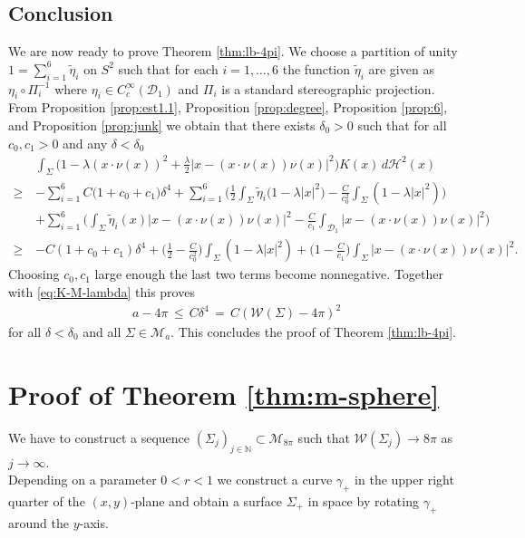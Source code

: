 \documentclass[reqno,makeidx,12pt]{amsart}
\theoremstyle{note}
\theoremstyle{definition}
\begin{document}
\subsection{Conclusion}
We are now ready to prove Theorem \ref{thm:lb-4pi}. We choose a partition of unity $1=\sum_{i=1}^6 \tilde{\eta}_i$ on $S^2$ such that for each $i=1,\dots,6$ the function $\tilde{\eta}_i$ are given as $\eta_i\circ {\Pi}_i^{-1}$ where $\eta_i \in C^\infty_c({\mathcal{D}}_1)$ and ${\Pi}_i$ is a standard stereographic projection. From Proposition \ref{prop:est1.1}, Proposition \ref{prop:degree}, Proposition \ref{prop:6}, and Proposition \ref{prop:junk} we obtain that there exists $\delta_0>0$ such that for all $c_0,c_1>0$ and any $\delta<\delta_0$  
\begin{align*}
	&\int_\Sigma \Big(1-\lambda(x\cdot\nu(x))^2 +
  	\frac{\lambda}{2}|x- (x\cdot\nu(x))\nu(x)|^2\Big) K(x)\,d{\ensuremath{\mathcal{H}}}^2(x) \\
	\geq\, &-\sum_{i=1}^6  C\big(1+c_0 + c_1 \big) \delta^4 + 
	\sum_{i=1}^6  \Big(\frac{1}{2} \int_{\Sigma} \tilde{\eta}_i \big(1-\lambda|x|^2\big) - \frac{C}{c_0^2} \int_{\Sigma} (1-\lambda|x|^2)\Big)\\
	&  +\sum_{i=1}^6  \Big(\int_{\Sigma} \tilde{\eta}_i(x) |x-(x	\cdot\nu(x))\nu(x)|^2  - \frac{C}{c_1}  \int_{{\mathcal{D}}_1 } |x-(x\cdot\nu(x))\nu(x)|^2\Big)\\
  	\geq\,& -C(1+c_0+c_1)\delta^4 +\Big(\frac{1}{2}- \frac{C}{c_0^2}\Big) \int_{\Sigma} (1-\lambda|x|^2) +  \Big(1-\frac{C}{c_1}\Big)\int_{\Sigma}  |x-(x	\cdot\nu(x))\nu(x)|^2 .
\end{align*}
Choosing $c_0,c_1$ large enough the last two terms become nonnegative. Together with \eqref{eq:K-M-lambda} this proves
\begin{gather*}
	a-4\pi \,\leq\, C\delta^4 \,=\, C ({\mathcal{W}}(\Sigma)-4\pi)^2
\end{gather*}
for all $\delta<\delta_0$ and all $\Sigma\in{\mathcal{M}}_a$. This concludes the proof of Theorem \ref{thm:lb-4pi}.
\section{Proof of Theorem \ref{thm:m-sphere}}
\label{sec:proof}
We have to construct a sequence
$(\Sigma_j)_{j\in{\ensuremath{\mathbb{N}}}}\subset {\mathcal{M}}_{8\pi}$ such that ${\mathcal{W}}(\Sigma_j)\to 8\pi$ as
$j\to \infty$. 
{\mbox{}\\\underline{}}
Depending on a parameter $0<r<1$ we construct a curve $\gamma_+$ in
the upper right quarter of the $(x,y)$-plane and obtain a surface
$\Sigma_+$ in space by rotating $\gamma_+$ around the $y$-axis.
\end{document}
